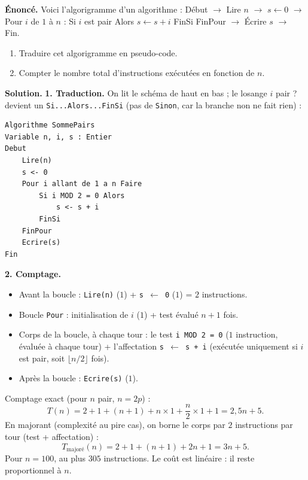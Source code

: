 \documentclass[11pt]{article}
\begin{document}
\begin{exoresolu}
\textbf{Énoncé.} Voici l'algorigramme d'un algorithme : Début $\rightarrow$ Lire $n$ $\rightarrow$ $s \leftarrow 0$ $\rightarrow$ Pour $i$ de $1$ à $n$ : Si $i$ est pair Alors $s \leftarrow s + i$ FinSi FinPour $\rightarrow$ Écrire $s$ $\rightarrow$ Fin.
\begin{enumerate}
\item Traduire cet algorigramme en pseudo-code.
\item Compter le nombre total d'instructions exécutées en fonction de $n$.
\end{enumerate}
\tcblower
\textbf{Solution.}
\textbf{1. Traduction.} On lit le schéma de haut en bas ; le losange \og $i$ pair ? \fg{} devient un \texttt{Si...Alors...FinSi} (pas de \texttt{Sinon}, car la branche \og non \fg{} ne fait rien) :

\begin{lstlisting}
Algorithme SommePairs
Variable n, i, s : Entier
Debut
    Lire(n)
    s <- 0
    Pour i allant de 1 a n Faire
        Si i MOD 2 = 0 Alors
            s <- s + i
        FinSi
    FinPour
    Ecrire(s)
Fin
\end{lstlisting}

\textbf{2. Comptage.}
\begin{itemize}
\item Avant la boucle : \texttt{Lire(n)} ($1$) + \texttt{s $\leftarrow$ 0} ($1$) = $2$ instructions.
\item Boucle \texttt{Pour} : initialisation de $i$ ($1$) + test évalué $n+1$ fois.
\item Corps de la boucle, à chaque tour : le test \texttt{i MOD 2 = 0} ($1$ instruction, évaluée à chaque tour) + l'affectation \texttt{s $\leftarrow$ s + i} (exécutée uniquement si $i$ est pair, soit $\lfloor n/2 \rfloor$ fois).
\item Après la boucle : \texttt{Ecrire(s)} ($1$).
\end{itemize}
Comptage exact (pour $n$ pair, $n=2p$) :
\[ T(n) = 2 + 1 + (n+1) + n \times 1 + \frac{n}{2} \times 1 + 1 = 2,5n + 5. \]
En majorant (complexité au pire cas), on borne le corps par $2$ instructions par tour (test + affectation) :
\[ T_{\text{majoré}}(n) = 2 + 1 + (n+1) + 2n + 1 = 3n + 5. \]
Pour $n = 100$, au plus $305$ instructions. Le coût est linéaire : il reste proportionnel à $n$.
\end{exoresolu}
\end{document}

